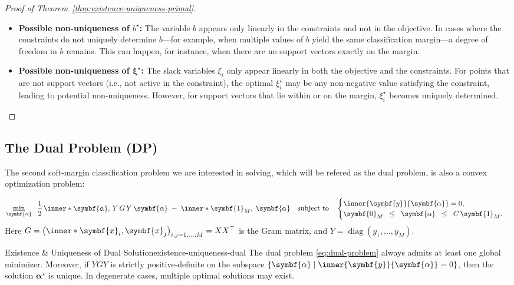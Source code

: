 \begin{proof}[Proof of Theorem~\ref{thm:existence-uniqueness-primal}]
\begin{itemize}
		\item \textbf{Possible non-uniqueness of $b^\star$:}
		      The variable $b$ appears only linearly in the constraints and not in the objective. In cases where the constraints do not uniquely determine $b$—for example, when multiple values of $b$ yield the same classification margin—a degree of freedom in $b$ remains. This can happen, for instance, when there are no support vectors exactly on the margin.

		\item \textbf{Possible non-uniqueness of $\symbf{\xi}^\star$:}
		      The slack variables $\xi_i$ only appear linearly in both the objective and the constraints. For points that are not support vectors (i.e., not active in the constraint), the optimal $\xi_i^\star$ may be any non-negative value satisfying the constraint, leading to potential non-uniqueness. However, for support vectors that lie within or on the margin, $\xi_i^\star$ becomes uniquely determined.
	\end{itemize}
\end{proof}

\subsection{The Dual Problem (DP)}

The second soft-margin classification problem we are interested in solving, which will be refered
as the dual problem, is also a convex optimization problem:

\begin{align}\label{eq:dual-problem}
	\min_{\symbf{\alpha}}
	\;\;\frac{1}{2}\,\inner*{\symbf{\alpha},\,Y\,G\,Y\,\symbf{\alpha}}
	\;-\;\inner*{\symbf{1}_M,\;\symbf{\alpha}}
	\quad
	\text{subject to}
	\quad
	\begin{cases}
		\inner{\symbf{y}}{\symbf{\alpha}} = 0, \\
		\symbf{0}_M \;\;\leq\;\; \symbf{\alpha} \;\;\leq\;\; C\,\symbf{1}_M.
	\end{cases}
\end{align}
Here $G = \bigl(\inner*{\symbf{x}_i, \symbf{x}_j}\bigr)_{i,j=1,\hdots,M} = X X^\top$ is the Gram matrix, and $Y=\operatorname{diag}(y_1,\dots,y_M)$.

\begin{theorem}{Existence \& Uniqueness of Dual Solution}{existence-uniqueness-dual}
	The dual problem \eqref{eq:dual-problem} always admits at least one global minimizer. Moreover, if $YGY$ is strictly positive-definite on the subspace $\{\symbf{\alpha}\mid \inner{\symbf{y}}{\symbf{\alpha}}=0\}$, then the solution $\symbf{\alpha}^\star$ is unique. In degenerate cases, multiple optimal solutions may exist.
\end{theorem}

